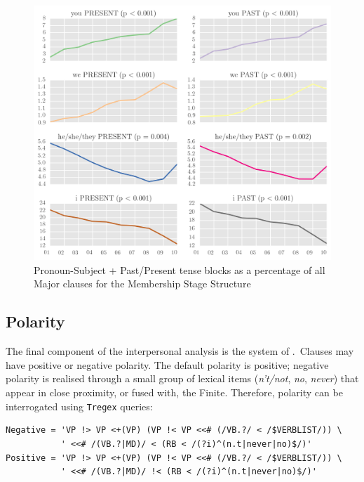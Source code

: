 \begin{figure}[htb]
\centering
\includegraphics[width=1\textwidth]{../images/subj-ten-const-p.png}
\caption[Pronoun-Subject + Past\slash Present tense blocks]{Pronoun-Subject + Past\slash Present tense blocks as a percentage of all Major clauses for the Membership Stage Structure}
\label{fig:tense_constellations}
\end{figure}

\subsection{Polarity}

The final component of the interpersonal analysis is the system of .~Clauses may have positive or negative polarity. The default polarity is positive; negative polarity is realised through a small group of lexical items (\emph{n't\slash not}, \emph{no}, \emph{never}) that appear in close proximity, or fused with, the Finite. Therefore, polarity can be interrogated using \texttt{Tregex} queries:

\begin{verbatim}
Negative = 'VP !> VP <+(VP) (VP !< VP <<# (/VB.?/ < /$VERBLIST/)) \
           ' <<# /(VB.?|MD)/ < (RB < /(?i)^(n.t|never|no)$/)'
Positive = 'VP !> VP <+(VP) (VP !< VP <<# (/VB.?/ < /$VERBLIST/)) \
           ' <<# /(VB.?|MD)/ !< (RB < /(?i)^(n.t|never|no)$/)'
\end{verbatim}

